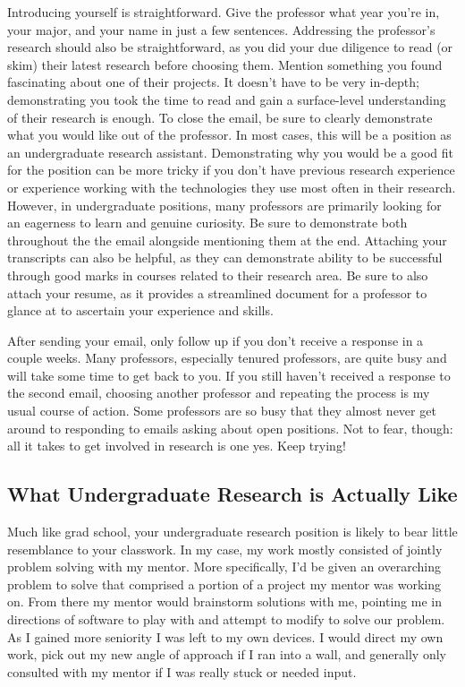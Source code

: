 \documentclass[12pt]{article}
\begin{document}
Introducing yourself is straightforward. Give the professor what year you're in, your major, and your name in just a few sentences. Addressing the professor's research should also be straightforward, as you did your due diligence to read (or skim) their latest research before choosing them. Mention something you found fascinating about one of their projects. It doesn't have to be very in-depth; demonstrating you took the time to read and gain a surface-level understanding of their research is enough. To close the email, be sure to clearly demonstrate what you would like out of the professor. In most cases, this will be a position as an undergraduate research assistant. Demonstrating why you would be a good fit for the position can be more tricky if you don't have previous research experience or experience working with the technologies they use most often in their research. However, in undergraduate positions, many professors are primarily looking for an eagerness to learn and genuine curiosity. Be sure to demonstrate both throughout the the email alongside mentioning them at the end. Attaching your transcripts can also be helpful, as they can demonstrate ability to be successful through good marks in courses related to their research area. Be sure to also attach your resume, as it provides a streamlined document for a professor to glance at to ascertain your experience and skills.

After sending your email, only follow up if you don't receive a response in a couple weeks. Many professors, especially tenured professors, are quite busy and will take some time to get back to you. If you still haven't received a response to the second email, choosing another professor and repeating the process is my usual course of action. Some professors are so busy that they almost never get around to responding to emails asking about open positions. Not to fear, though: all it takes to get involved in research is one yes. Keep trying!

\subsection{What Undergraduate Research is Actually Like}

Much like grad school, your undergraduate research position is likely to bear little resemblance to your classwork. In my case, my work mostly consisted of jointly problem solving with my mentor. More specifically, I'd be given an overarching problem to solve that comprised a portion of a project my mentor was working on. From there my mentor would brainstorm solutions with me, pointing me in directions of software to play with and attempt to modify to solve our problem. As I gained more seniority I was left to my own devices. I would direct my own work, pick out my new angle of approach if I ran into a wall, and generally only consulted with my mentor if I was really stuck or needed input.
\end{document}
